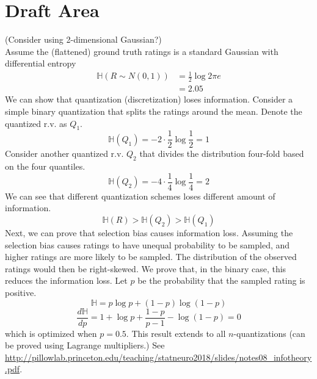 \documentclass{article}
\def\HH{\mathbb{H}}
\begin{document}
\section{Draft Area}
 (Consider using 2-dimensional Gaussian?)\\
Assume the (flattened) ground truth ratings is a standard Gaussian with differential entropy
\begin{align} \HH(R\sim N(0, 1))
   & = \frac{1}{2}\log 2\pi e \\
   & = 2.05
\end{align}
We can show that quantization (discretization) loses information. Consider
a simple binary quantization that splits the ratings around the mean. Denote the quantized r.v. as $Q_1$.
\[ \HH(Q_1) = -2 \cdot \frac{1}{2} \log \frac{1}{2} = 1 \]
Consider another quantized r.v. $Q_2$ that divides the distribution four-fold based on the four quantiles.
\[ \HH(Q_2) = -4 \cdot \frac{1}{4} \log \frac{1}{4} = 2 \]
We can see that different quantization schemes loses different amount of information.
\[ \HH(R) > \HH(Q_2) > \HH(Q_1) \]
Next, we can prove that selection bias causes information loss. Assuming the selection bias causes ratings to have unequal probability to be sampled, and higher ratings are more likely to be sampled. The distribution of the observed ratings would then be right-skewed. We prove that, in the binary case, this reduces the information loss. Let $p$ be the probability that the sampled rating is positive.
\[\HH = p\log p + (1-p) \log (1-p) \]
\[ \frac{d\HH}{dp} = 1 + \log p + \frac{1-p}{p-1} - \log(1-p) = 0 \]
which is optimized when $p = 0.5$. This result extends to all $n$-quantizations (can be proved using Lagrange multipliers.) See \url{http://pillowlab.princeton.edu/teaching/statneuro2018/slides/notes08_infotheory.pdf}.



\end{document}
